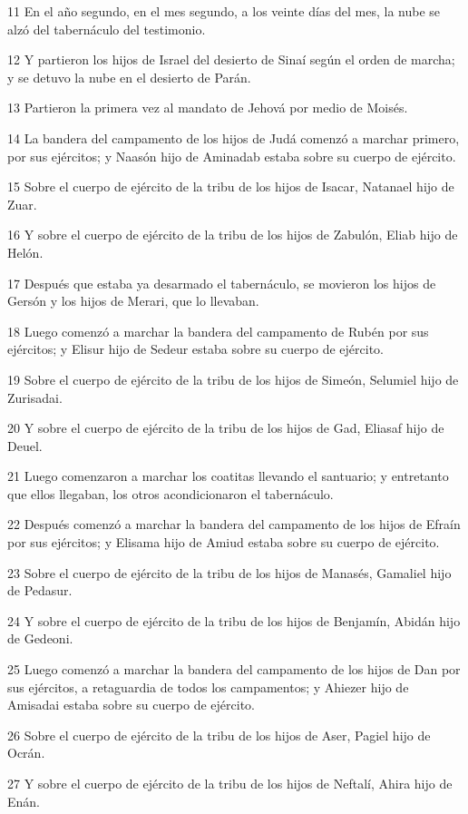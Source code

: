 \par 11 En el año segundo, en el mes segundo, a los veinte días del mes, la nube se alzó del tabernáculo del testimonio.
\par 12 Y partieron los hijos de Israel del desierto de Sinaí según el orden de marcha; y se detuvo la nube en el desierto de Parán.
\par 13 Partieron la primera vez al mandato de Jehová por medio de Moisés.
\par 14 La bandera del campamento de los hijos de Judá comenzó a marchar primero, por sus ejércitos; y Naasón hijo de Aminadab estaba sobre su cuerpo de ejército.
\par 15 Sobre el cuerpo de ejército de la tribu de los hijos de Isacar, Natanael hijo de Zuar.
\par 16 Y sobre el cuerpo de ejército de la tribu de los hijos de Zabulón, Eliab hijo de Helón.
\par 17 Después que estaba ya desarmado el tabernáculo, se movieron los hijos de Gersón y los hijos de Merari, que lo llevaban.
\par 18 Luego comenzó a marchar la bandera del campamento de Rubén por sus ejércitos; y Elisur hijo de Sedeur estaba sobre su cuerpo de ejército.
\par 19 Sobre el cuerpo de ejército de la tribu de los hijos de Simeón, Selumiel hijo de Zurisadai.
\par 20 Y sobre el cuerpo de ejército de la tribu de los hijos de Gad, Eliasaf hijo de Deuel.
\par 21 Luego comenzaron a marchar los coatitas llevando el santuario; y entretanto que ellos llegaban, los otros acondicionaron el tabernáculo.
\par 22 Después comenzó a marchar la bandera del campamento de los hijos de Efraín por sus ejércitos; y Elisama hijo de Amiud estaba sobre su cuerpo de ejército.
\par 23 Sobre el cuerpo de ejército de la tribu de los hijos de Manasés, Gamaliel hijo de Pedasur.
\par 24 Y sobre el cuerpo de ejército de la tribu de los hijos de Benjamín, Abidán hijo de Gedeoni.
\par 25 Luego comenzó a marchar la bandera del campamento de los hijos de Dan por sus ejércitos, a retaguardia de todos los campamentos; y Ahiezer hijo de Amisadai estaba sobre su cuerpo de ejército.
\par 26 Sobre el cuerpo de ejército de la tribu de los hijos de Aser, Pagiel hijo de Ocrán.
\par 27 Y sobre el cuerpo de ejército de la tribu de los hijos de Neftalí, Ahira hijo de Enán.
